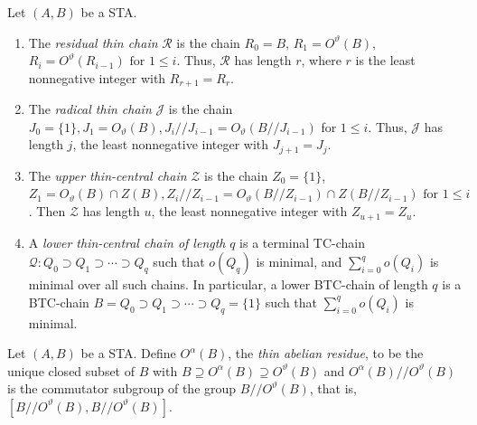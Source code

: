 \begin{defi}
\label{def:ptc_chains} 
Let $(A, B)$ be a STA.
\begin{enumerate}[label = (\roman*)] 
\item\label{defi1.11_i} The \emph{residual thin 
chain} $
\mathcal{R}$ is the chain $R_0 = B$, $R_1 =
O^{\vartheta}(B)$, $R_i = O^{\vartheta}(R_{i-1}) \mbox{ for }1 \leq i$. 
Thus, $\mathcal{R}$ has length $r$, where $r$ is the least nonnegative
integer with $R_{r+1} = R_r$.
\item\label{defi1.11_ii} The \emph{radical thin chain} $\mathcal{J}$ is the chain $J_0 = \{1\}, J_1 =
O_{\vartheta}(B), J_i//J_{i-1} = O_{\vartheta}(B//J_{i-1})$ for $1
\leq i$. Thus, $\mathcal{J}$ has length $j$, the least nonnegative
integer with $J_{j+1} = J_j$.
\item\label{defi1.11_iii} The \emph{upper thin-central chain} $\mathcal{Z}$ is the chain $Z_0 = \{1\}$, $
Z_1 = O_{\vartheta}(B) \cap Z(B), Z_i//Z_{i-1} =
O_{\vartheta}(B//Z_{i-1}) \cap Z(B//Z_{i-1}) \mbox{ for }1 \leq i$. Then
$\mathcal{Z}$ has length $u$, the least nonnegative integer with
$Z_{u+1} = Z_u$.
\item\label{defi1.11_iv} A \emph{lower thin-central chain of length} $q$ is a terminal TC-chain $\mathcal{Q}:
Q_0 \supset Q_1 \supset \cdots \supset Q_q$ 
such that $o(Q_q)$ is minimal, and $\sum_{i=0}^qo(Q_i)$ is 
minimal over all such chains. In particular, a lower \mbox{BTC-}chain
 of length $q$ is a BTC-chain $B = Q_0 \supset Q_1 \supset \cdots \supset
Q_q = \{1\}$ such that $\sum_{i=0}^qo(Q_i)$ is minimal. 
\end{enumerate}
\end{defi}

\begin{defi}
\label{def:abel_res}
Let $(A, B)$ be a STA. Define $O^{\alpha}(B)$, the \emph{thin abelian
residue}, to be the unique closed subset of $B$ with $B \supseteq
O^{\alpha}(B) \supseteq O^{\vartheta}(B)$ and
$O^{\alpha}(B)//O^{\vartheta}(B)$ is the commutator subgroup of the group
$B//O^{\vartheta}(B)$, that is, $[B//O^{\vartheta}(B),
B//O^{\vartheta}(B)]$. 
\end{defi}
 
